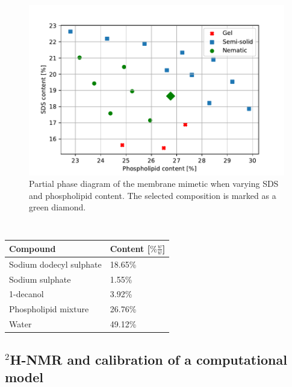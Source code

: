 \documentclass[3p,preprint,review]{elsarticle}
\begin{document}
	\begin{figure}[h]
		\centering
		\includegraphics[width=\columnwidth]{phase_diag}
		\caption{Partial phase diagram of the membrane mimetic when varying SDS and
			phospholipid content. The selected composition is marked as a green
			diamond.}
		\label{fig:phase_diag}
	\end{figure}
	
	\begin{table}[h]
		\small
		\caption{\ }
		\label{tab:mimetic_composition}
		\begin{tabular*}{0.96\columnwidth}{@{\extracolsep{\fill}}ll}
			\hline
			Compound & Content [$\%\tfrac{w}{w}$] \\
			\hline
			Sodium dodecyl sulphate &  18.65\% \\
			Sodium sulphate & 1.55\%  \\
			1-decanol & 3.92\%  \\
			Phospholipid mixture & 26.76\%  \\
			Water & 49.12\% \\
			\hline
		\end{tabular*}
	\end{table}
	
	\subsection{$^2$H-NMR and calibration of a computational model}
	\label{sec:calib}
	
\end{document}
